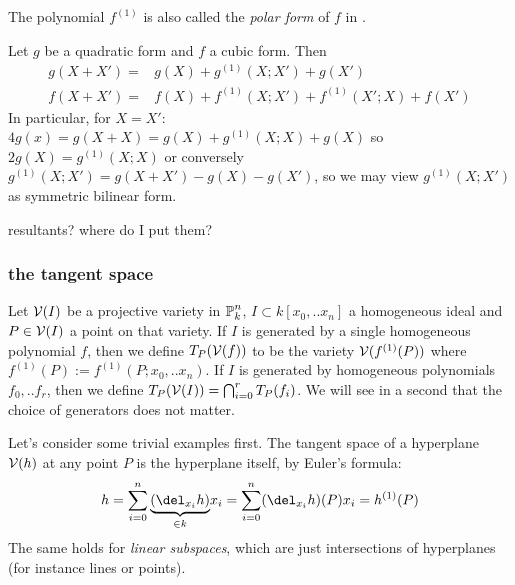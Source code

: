 \begin{remark}
The polynomial $f^{(1)}$ is also called the \emph{polar form} of $f$ in \cite[p. 104]{reid1988undergraduate}.
\end{remark}

\begin{corollary} \label{corollaryTaylorForQuadricAndCubic}
Let $g$ be a quadratic form and $f$ a cubic form. Then
\begin{align}
g(X+X') =& g(X) + g^{(1)}(X;X') + g(X')
\\ f(X+X') =& f(X) + f^{(1)}(X;X') + f^{(1)}(X';X) + f(X')
\end{align}
In particular, for $X=X'$: $4g(x) = g(X+X) = g(X) + g^{(1)}(X;X) + g(X)$ so $2g(X) = g^{(1)}(X;X)$ or conversely $g^{(1)}(X;X') = g(X+X') - g(X) - g(X')$, so we may view $g^{(1)}(X;X')$ as symmetric bilinear form.
\end{corollary}

\begin{todo}
\item resultants? where do I put them?
\end{todo}


\subsubsection{the tangent space}

\begin{definition} \label{definitionTangentSpace}
Let $\operatorname{\mathcal V}(I)$ be a projective variety in $\operatorname{\mathbb P}^n_k$, $I \subset k[x_0,..x_n]$ a homogeneous ideal and $P\in \operatorname{\mathcal V}(I)$ a point on that variety.
If $I$ is generated by a single homogeneous polynomial $f$, then we define $T_P(\operatorname{\mathcal V}(f))$ to be the variety $\operatorname{\mathcal V}(f^{(1)}(P))$ where $f^{(1)}(P) := f^{(1)}(P;x_0,..x_n)$.
If $I$ is generated by homogeneous polynomials $f_0,..f_r$, then we define $T_P(\operatorname{\mathcal V}(I)) = \bigcap_{i=0}^r T_P(f_i)$.
We will see in a second that the choice of generators does not matter.
\end{definition}

\begin{example} \label{exampleTangentPlaneOfLinearSubsets}
Let's consider some trivial examples first.
The tangent space of a hyperplane $\operatorname{\mathcal V}(h)$ at any point $P$ is the hyperplane itself, by Euler's formula:
\begin{equation}
h = \sum_{i=0}^n \underset{\in k}{\underbrace{(\del_{x_i}h)}}x_i = \sum_{i=0}^n (\del_{x_i}h)(P) x_i = h^{(1)}(P)
\end{equation}
The same holds for \emph{linear subspaces}, which are just intersections of hyperplanes (for instance lines or points).
\end{example}

